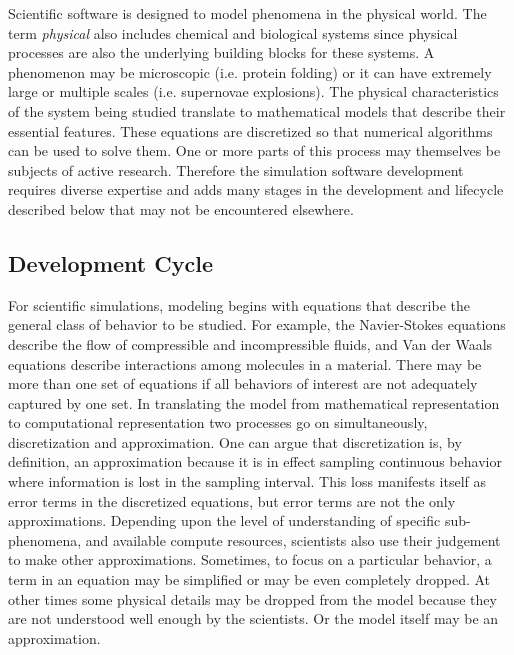 \label{sec:lifecycle} 
Scientific software is designed to model phenomena in the
physical world. The term {\em physical} also includes chemical and
biological systems since physical processes are also the underlying building
blocks for these systems. A phenomenon may be microscopic
(i.e. protein folding) or it can have extremely large or multiple scales
(i.e. supernovae explosions). The physical characteristics of the
system being studied translate to mathematical models that 
describe their essential features. These equations are 
discretized so that  numerical algorithms can be used to solve them. One or
more parts of this process may themselves be subjects of active
research. Therefore the simulation software development requires
diverse expertise and  adds many stages in the development and
lifecycle described below that may not be encountered elsewhere.   

\subsection{Development Cycle}
\label{sec:dev-cycle}
For scientific simulations, modeling begins with equations that describe the
general class of behavior to be studied. For example, the Navier-Stokes
equations describe the flow of compressible and incompressible
fluids, and Van der Waals equations describe interactions among
molecules in a material. There may be more than one set of equations
if all behaviors of interest are not adequately captured by one set.
In translating the model from mathematical representation to
computational representation two processes go on simultaneously,
discretization and approximation. One can argue that discretization is,
by definition, an approximation because it is in effect sampling
continuous behavior where information is lost in the sampling
interval. This loss manifests itself as error terms in the discretized
equations, but error terms are not the only 
approximations. Depending upon the level of understanding of specific
sub-phenomena, and available compute resources, scientists also 
use their judgement to make other approximations. Sometimes, to focus on a
particular behavior, a term in an equation may be simplified or may be even completely
dropped. At other times some physical details may be dropped
from the model because they are not understood well enough by the
scientists.  Or the model itself may be an approximation.  

